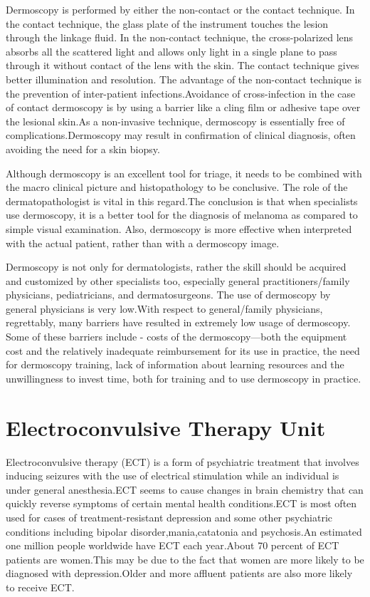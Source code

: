 \documentclass[12pt,A4paper]{article}
\begin{document}
Dermoscopy is performed by either the non-contact or the contact technique. In the contact technique, the glass plate of the instrument touches the lesion through the linkage fluid. In the non-contact technique, the cross-polarized lens absorbs all the scattered light and allows only light in a single plane to pass through it without contact of the lens with the skin. The contact technique gives better illumination and resolution. The advantage of the non-contact technique is the prevention of inter-patient infections.Avoidance of cross-infection in the case of contact dermoscopy is by using a barrier like a cling film or adhesive tape over the lesional skin.As a non-invasive technique, dermoscopy is essentially free of complications.Dermoscopy may result in confirmation of clinical diagnosis, often avoiding the need for a skin biopsy. 

Although dermoscopy is an excellent tool for triage, it needs to be combined with the macro clinical picture and histopathology to be conclusive. The role of the dermatopathologist is vital in this regard.The conclusion is that when specialists use dermoscopy, it is a better tool for the diagnosis of melanoma as compared to simple visual examination. Also, dermoscopy is more effective when interpreted with the actual patient, rather than with a dermoscopy image.

Dermoscopy is not only for dermatologists, rather the skill should be acquired and customized by other specialists too, especially general practitioners/family physicians, pediatricians, and dermatosurgeons.
The use of dermoscopy by general physicians is very low.With respect to general/family physicians, regrettably, many barriers have resulted in extremely low usage of dermoscopy. Some of these barriers include - costs of the dermoscopy—both the equipment cost and the relatively inadequate reimbursement for its use in practice, the need for dermoscopy training, lack of information about learning resources and the unwillingness to invest time, both for training and to use dermoscopy in practice.
\newpage 
\section{Electroconvulsive Therapy Unit}
Electroconvulsive therapy (ECT) is a form of psychiatric treatment that involves inducing seizures with the use of electrical stimulation while an individual is under general anesthesia.ECT seems to cause changes in brain chemistry that can quickly reverse symptoms of certain mental health conditions.ECT is most often used for cases of treatment-resistant depression and some other psychiatric conditions including bipolar disorder,mania,catatonia and psychosis.An estimated one million people worldwide have ECT each year.About 70 percent of ECT patients are women.This may be due to the fact that women are more likely to be diagnosed with depression.Older and more affluent patients are also more likely to receive ECT.
\end{document}
